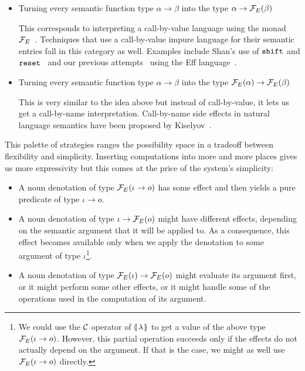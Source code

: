 \begin{itemize}
\item Turning every semantic function type $\alpha \to \beta$ into the type
  $\alpha \to \mathcal{F}_E(\beta)$

  This corresponds to interpreting a call-by-value language using the monad
  $\mathcal{F}_E$~\cite{moggi1991notions,wadler1992essence}. Techniques that use a
  call-by-value impure language for their semantic entries fall in this
  category as well. Examples include Shan's use of $\mathtt{shift}$ and
  $\mathtt{reset}$~\cite{shan2004delimited,shan2005linguistic} and our previous
  attempts~\cite{marsik2014algebraic} using the Eff
  language~\cite{bauer2012programming}.

\item Turning every semantic function type $\alpha \to \beta$ into the type
  $\mathcal{F}_E(\alpha) \to \mathcal{F}_E(\beta)$

  This is very similar to the idea above but instead of call-by-value, it
  lets us get a call-by-name interpretation. Call-by-name side effects in
  natural language semantics have been proposed by
  Kiselyov~\cite{kiselyov2008call}.
\end{itemize}

This palette of strategies ranges the possibility space in a tradeoff
between flexibility and simplicity. Inserting computations into more and
more places gives us more expressivity but this comes at the price of the
system's simplicity:

\begin{itemize}
\item A noun denotation of type $\mathcal{F}_E(\iota \to o)$ has some effect and
  then yields a pure predicate of type $\iota \to o$.
\item A noun denotation of type $\iota \to \mathcal{F}_E(o)$ might have different
  effects, depending on the semantic argument that it will be applied
  to. As a consequence, this effect becomes available only when we apply
  the denotation to some argument of type $\iota$\footnote{We could use the
    $\mathcal{C}$ operator of $\llparenthesis \, \lambda \, \rrparenthesis$ to get a value of the above type
    $\mathcal{F}_E(\iota \to o)$. However, this partial operation succeeds only if
    the effects do not actually depend on the argument. If that is the
    case, we might as well use $\mathcal{F}_E(\iota \to o)$ directly.}.
\item A noun denotation of type $\mathcal{F}_E(\iota) \to \mathcal{F}_E(o)$ might evaluate
  its argument first, or it might perform some other effects, or it might
  handle some of the operations used in the computation of its argument.
\end{itemize}

